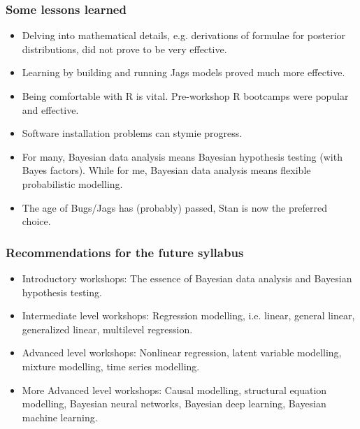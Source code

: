 \begin{frame}
	\frametitle{Some lessons learned}

	\begin{itemize}

		\item Delving into mathematical details, e.g. derivations of formulae for posterior distributions, did not prove to be very effective.
		\item Learning by building and running Jags models proved much more effective.
		\item Being comfortable with R is vital. Pre-workshop R bootcamps were popular and effective.
		\item Software installation problems can stymie progress.
		\item For many, Bayesian data analysis means Bayesian hypothesis testing (with Bayes factors). While for me, Bayesian data analysis means flexible probabilistic modelling.
		\item The age of Bugs/Jags has (probably) passed, Stan is now the preferred choice.

	\end{itemize}

\end{frame}

\begin{frame}
	\frametitle{Recommendations for the future syllabus}

	\begin{itemize}

		\item Introductory workshops: The essence of Bayesian data analysis and Bayesian hypothesis testing.
		\item Intermediate level workshops: Regression modelling, i.e. linear, general linear, generalized linear, multilevel regression.
		\item Advanced level workshops: Nonlinear regression, latent variable modelling, mixture modelling, time series modelling.
		\item More Advanced level workshops: Causal modelling, structural equation modelling, Bayesian neural networks, Bayesian deep learning, Bayesian machine learning.

	\end{itemize}

\end{frame}


